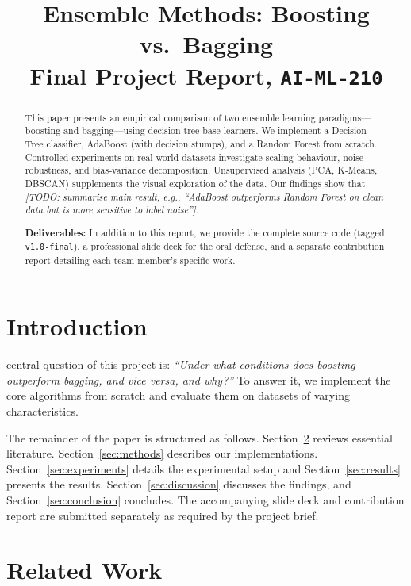 \documentclass[conference]{IEEEtran}
\title{Ensemble Methods: Boosting vs.\ Bagging\\ {\large Final Project Report, \texttt{AI‑ML‑210}}}
\author{
\IEEEauthorblockN{Author One, Author Two, Author Three}
\IEEEauthorblockA{AI Academy, National AI Center\\
Spring 2026\\
\{email1, email2, email3\}@example.com}
}
\begin{document}
\maketitle

\begin{abstract}
This paper presents an empirical comparison of two ensemble learning
paradigms---boosting and bagging---using decision‑tree base learners.
We implement a Decision Tree classifier, AdaBoost (with decision
stumps), and a Random Forest from scratch.  Controlled experiments on
real‑world datasets investigate scaling behaviour, noise robustness,
and bias‑variance decomposition.  Unsupervised analysis (PCA,
K‑Means, DBSCAN) supplements the visual exploration of the data.
Our findings show that \emph{[TODO: summarise main result, e.g.,
“AdaBoost outperforms Random Forest on clean data but is more
sensitive to label noise”]}.

\textbf{Deliverables:} In addition to this report, we provide the
complete source code (tagged \texttt{v1.0-final}), a professional
slide deck for the oral defense, and a separate contribution report
detailing each team member's specific work.
\end{abstract}

\section{Introduction}
\label{sec:intro}
 central question of this project is: \textit{``Under
what conditions does boosting outperform bagging, and vice versa, and
why?''}  To answer it, we implement the core algorithms from scratch
and evaluate them on datasets of varying characteristics.

The remainder of the paper is structured as follows.
Section~\ref{sec:related} reviews essential literature.
Section~\ref{sec:methods} describes our implementations.
Section~\ref{sec:experiments} details the experimental setup and
Section~\ref{sec:results} presents the results.
Section~\ref{sec:discussion} discusses the findings, and
Section~\ref{sec:conclusion} concludes.
The accompanying slide deck and contribution report are submitted
separately as required by the project brief.

\section{Related Work}
\label{sec:related}
\end{document}

